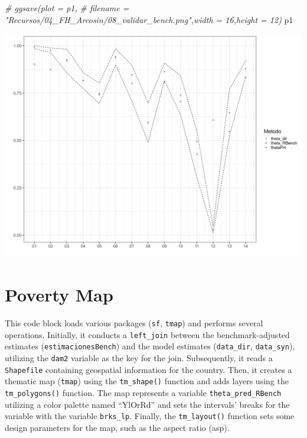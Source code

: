 \documentclass[
  12pt,
]{book}
\newenvironment{Shaded}{\begin{snugshade}}{\end{snugshade}}
\newcommand{\CommentTok}[1]{\textcolor[rgb]{0.56,0.35,0.01}{\textit{#1}}}
\newcommand{\NormalTok}[1]{#1}
\begin{document}
\begin{Shaded}
\begin{Highlighting}[]
\CommentTok{\# ggsave(plot = p1,}
\CommentTok{\#        filename = "Recursos/04\_FH\_Arcosin/08\_validar\_bench.png",width = 16,height = 12)}
\NormalTok{p1 }
\end{Highlighting}
\end{Shaded}

\includegraphics{Recursos/04_FH_Arcosin/08_validar_bench.png}

\hypertarget{poverty-map}{%
\section{Poverty Map}\label{poverty-map}}

This code block loads various packages (\texttt{sf}, \texttt{tmap}) and performs several operations. Initially, it conducts a \texttt{left\_join} between the benchmark-adjusted estimates (\texttt{estimacionesBench}) and the model estimates (\texttt{data\_dir}, \texttt{data\_syn}), utilizing the \texttt{dam2} variable as the key for the join. Subsequently, it reads a \texttt{Shapefile} containing geospatial information for the country. Then, it creates a thematic map (\texttt{tmap}) using the \texttt{tm\_shape()} function and adds layers using the \texttt{tm\_polygons()} function. The map represents a variable \texttt{theta\_pred\_RBench} utilizing a color palette named ``YlOrRd'' and sets the intervals' breaks for the variable with the variable \texttt{brks\_lp}. Finally, the \texttt{tm\_layout()} function sets some design parameters for the map, such as the aspect ratio (asp).
\end{document}
